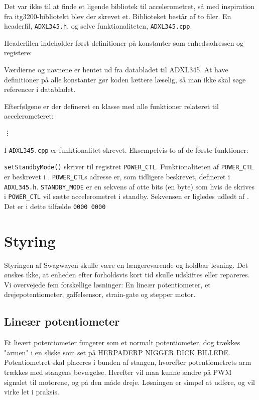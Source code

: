 \documentclass[a4paper,oneside,article,danish,table]{memoir}
\newcommand{\adxlh}[2]{}
\newcommand{\adxlc}[2]{}
\begin{document}
Det var ikke til at finde et ligende bibliotek til accelerometret, så med inspiration fra itg3200-bibliotekt blev der skrevet et. Biblioteket består af to filer. En headerfil, \texttt{ADXL345.h}, og selve funktionaliteten, \texttt{ADXL345.cpp}.

Headerfilen indeholder først definitioner på konstanter som enhedsadressen og registere:
\adxlh{23}{35}
Værdierne og navnene er hentet ud fra databladet til ADXL345. \cite{adxl345} At have definitioner på alle konstanter gør koden lættere læselig, så man ikke skal søge referencer i databladet.

Efterfølgene er der defineret en klasse med alle funktioner relateret til accelerometeret:
\adxlh{37}{49}
\begin{center}
  \vdots
\end{center}

I \texttt{ADXL345.cpp} er funktionalitet skrevet. Eksempelvis to af de første funktioner:
\adxlc{28}{36}
\lstinline{setStandbyMode()} skriver til registret \lstinline{POWER_CTL}. Funktionaliteten af \lstinline{POWER_CTL} er beskrevet i \cite{ADXL345}. \lstinline{POWER_CTL}s adresse er, som tidligere beskrevet, defineret i \texttt{ADXL345.h}. \lstinline{STANDBY_MODE} er en sekvens af otte bits (en byte) som hvis de skrives i \lstinline{POWER_CTL} vil sætte accelerometret i standby. Sekvensen er ligledes udledt af \cite{ADXL345}. Det er i dette tilfælde \texttt{0000\,0000}

\section{Styring}
Styringen af Swagwayen skulle være en længerevarende og holdbar løsning. Det ønskes ikke, at enheden efter forholdsvis kort tid skulle udskiftes eller repareres. Vi overvejede fem forskellige løsninger: En lineær potentiometer, et drejepotentiometer, gaffelsensor, strain-gate og stepper motor.
\subsection{Lineær potentiometer} 
Et lieært potentiometer fungerer som et normalt potentiometer, dog trækkes "armen" i en sliske som set på HERPADERP NIGGER DICK BILLEDE. 
Potentiometret skal placeres i bunden af stangen, hvorefter potentiometrets arm trækkes med stangens bevægelse. Herefter vil man kunne ændre på PWM signalet til motorene, og på den måde dreje. Løsningen er simpel at udføre, og vil virke let i praksis.
\end{document}
